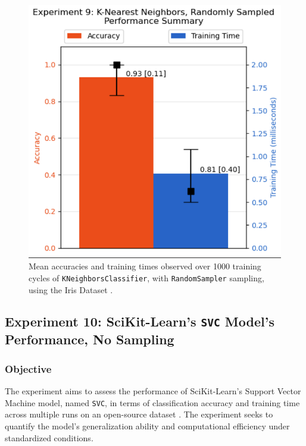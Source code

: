 \documentclass{article}
\theoremstyle{plain}
\theoremstyle{definition}
\theoremstyle{remark}
\begin{document}
\begin{figure}[ht]
	\vskip 0.2in
	\begin{center}
		\centerline{\includegraphics[width=\columnwidth]{experiment_09}}
		\caption{Mean accuracies and training times observed over 1000 training cycles of \texttt{KNeighborsClassifier}, with \texttt{RandomSampler} sampling, using the Iris Dataset \cite{iris}.}
		\label{experiment_09}
	\end{center}
	\vskip -0.2in
\end{figure}


\subsection{Experiment 10: SciKit-Learn's \texttt{SVC} Model's Performance, No Sampling}

\subsubsection{Objective}

The experiment aims to assess the performance of SciKit-Learn's Support Vector Machine model, named \texttt{SVC}, in terms of classification accuracy and training time across multiple runs on an open-source dataset \cite{iris}. The experiment seeks to quantify the model's generalization ability and computational efficiency under standardized conditions.
\end{document}
